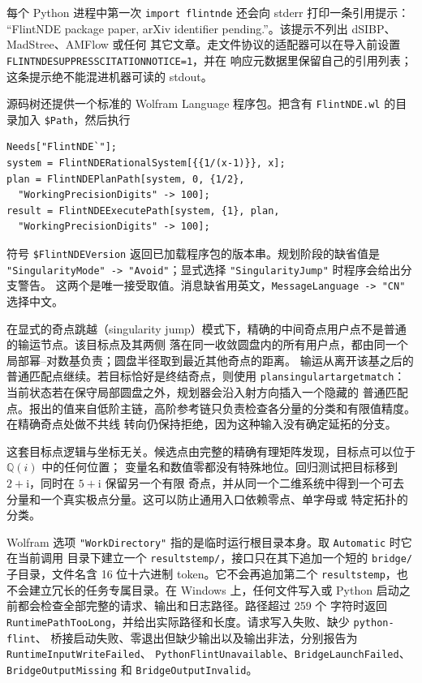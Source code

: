 \documentclass[11pt,a4paper]{ctexart}
\renewcommand{\_}{\origunderscore\allowbreak}
\begin{document}
每个 Python 进程中第一次 \texttt{import flintnde} 还会向 stderr 打印一条引用提示：
``FlintNDE package paper, arXiv identifier pending.''。该提示不列出 dSIBP、MadStree、AMFlow 或任何
其它文章。走文件协议的适配器可以在导入前设置 \texttt{FLINTNDE\_SUPPRESS\_CITATION\_NOTICE=1}，并在
响应元数据里保留自己的引用列表；这条提示绝不能混进机器可读的 stdout。

源码树还提供一个标准的 Wolfram Language 程序包。把含有 \texttt{FlintNDE.wl} 的目录加入
\texttt{\$Path}，然后执行
\begin{verbatim}
Needs["FlintNDE`"];
system = FlintNDERationalSystem[{{1/(x-1)}}, x];
plan = FlintNDEPlanPath[system, 0, {1/2},
  "WorkingPrecisionDigits" -> 100];
result = FlintNDEExecutePath[system, {1}, plan,
  "WorkingPrecisionDigits" -> 100];
\end{verbatim}
符号 \texttt{\$FlintNDEVersion} 返回已加载程序包的版本串。规划阶段的缺省值是
\texttt{"SingularityMode" -> "Avoid"}；显式选择 \texttt{"SingularityJump"} 时程序会给出分支警告。
这两个是唯一接受取值。消息缺省用英文，\texttt{MessageLanguage -> "CN"} 选择中文。

在显式的奇点跳越（singularity jump）模式下，精确的中间奇点用户点不是普通的输运节点。该目标点及其两侧
落在同一收敛圆盘内的所有用户点，都由同一个局部幂--对数基负责；圆盘半径取到最近其他奇点的距离。
输运从离开该基之后的普通匹配点继续。若目标恰好是终结奇点，则使用
\texttt{plan\_singular\_target\_match}：当前状态若在保守局部圆盘之外，规划器会沿入射方向插入一个隐藏的
普通匹配点。报出的值来自低阶主链，高阶参考链只负责检查各分量的分类和有限值精度。在精确奇点处做不共线
转向仍保持拒绝，因为这种输入没有确定延拓的分支。

这套目标点逻辑与坐标无关。候选点由完整的精确有理矩阵发现，目标点可以位于 $\mathbb Q(i)$ 中的任何位置；
变量名和数值零都没有特殊地位。回归测试把目标移到 $2+\mathrm{i}$，同时在 $5+\mathrm{i}$ 保留另一个有限
奇点，并从同一个二维系统中得到一个可去分量和一个真实极点分量。这可以防止通用入口依赖零点、单字母或
特定拓扑的分类。

Wolfram 选项 \texttt{"WorkDirectory"} 指的是临时运行根目录本身。取 \texttt{Automatic} 时它在当前调用
目录下建立一个 \texttt{results\_temp/}，接口只在其下追加一个短的 \texttt{bridge/} 子目录，文件名含
16 位十六进制 token。它不会再追加第二个 \texttt{results\_temp}，也不会建立冗长的任务专属目录。在
Windows 上，任何文件写入或 Python 启动之前都会检查全部完整的请求、输出和日志路径。路径超过 259 个
字符时返回 \texttt{RuntimePathTooLong}，并给出实际路径和长度。请求写入失败、缺少 \texttt{python-flint}、
桥接启动失败、零退出但缺少输出以及输出非法，分别报告为 \texttt{RuntimeInputWriteFailed}、
\texttt{PythonFlintUnavailable}、\texttt{BridgeLaunchFailed}、\texttt{BridgeOutputMissing} 和
\texttt{BridgeOutputInvalid}。
\end{document}
